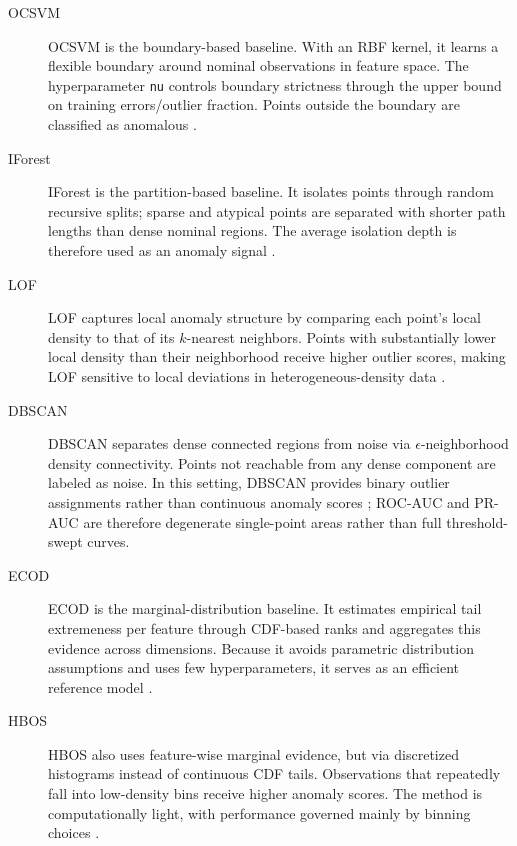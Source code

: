\documentclass[cameraready]{Interspeech}
\begin{document}
\begin{description}
    \item[OCSVM] OCSVM is the boundary-based baseline. With an RBF kernel, it learns a flexible boundary around nominal observations in feature space. The hyperparameter \texttt{nu} controls boundary strictness through the upper bound on training errors/outlier fraction. Points outside the boundary are classified as anomalous \cite{scholkopf2001support}.

    \item[IForest] IForest is the partition-based baseline. It isolates points through random recursive splits; sparse and atypical points are separated with shorter path lengths than dense nominal regions. The average isolation depth is therefore used as an anomaly signal \cite{liu2008isolation}.

    \item[LOF] LOF captures local anomaly structure by comparing each point's local density to that of its \(k\)-nearest neighbors. Points with substantially lower local density than their neighborhood receive higher outlier scores, making LOF sensitive to local deviations in heterogeneous-density data \cite{breunig2000lof}.

    \item[DBSCAN] DBSCAN separates dense connected regions from noise via \(\epsilon\)-neighborhood density connectivity. Points not reachable from any dense component are labeled as noise. In this setting, DBSCAN provides binary outlier assignments rather than continuous anomaly scores \cite{ester1996dbscan}; ROC-AUC and PR-AUC are therefore degenerate single-point areas rather than full threshold-swept curves.

    \item[ECOD] ECOD is the marginal-distribution baseline. It estimates empirical tail extremeness per feature through CDF-based ranks and aggregates this evidence across dimensions. Because it avoids parametric distribution assumptions and uses few hyperparameters, it serves as an efficient reference model \cite{li2022ecod}.

    \item[HBOS] HBOS also uses feature-wise marginal evidence, but via discretized histograms instead of continuous CDF tails. Observations that repeatedly fall into low-density bins receive higher anomaly scores. The method is computationally light, with performance governed mainly by binning choices \cite{goldstein2012hbos}.
\end{description}
\end{document}
